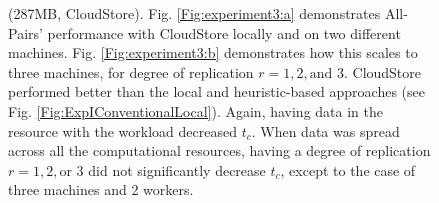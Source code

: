 \documentclass{rspublic}
\newcommand{\fixme}[1]{ { \bf{ ***FIXME: #1
}} } \newcommand{\jhanote}[1]{ {\textcolor{red} { ***Jha: #1 }}}
\newcommand{\micnote}[1]{ {\textcolor{blue} { ***Michael: #1 }}}
\newcommand{\betynote}[1]{ {\textcolor{orange} { ***Bety: #1 }}}
\newcommand{\jhanote}[1]{} \newcommand{\micnote}[1]{}\newcommand{\betynote}[1]{} \newcommand{\fixme}[1]{}
\begin{document}
\begin{figure}
\begin{center}
\caption{(287MB, CloudStore).  Fig. \ref{Fig:experiment3:a}
  demonstrates All-Pairs' performance with CloudStore locally and on
  two different machines. Fig. \ref{Fig:experiment3:b} demonstrates
  how this scales to three machines, for degree of replication
  $r=1,2,\mbox{and } 3$. CloudStore performed better than the local
  and heuristic-based approaches (see Fig.
  \ref{Fig:ExpIConventionalLocal}). Again, having data in the resource
  with the workload decreased $t_c$. When data was spread across all
  the computational resources, having a degree of replication $r = 1,
  2, \mbox{or } 3$ did not significantly decrease $t_c$, except to the
  case of three machines and 2 workers.}
\label{Fig:experiment3}
\end{center}
\vspace{-0.3cm}
\end{figure}
\end{document}
